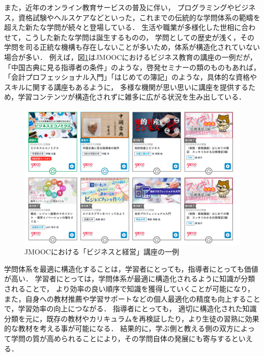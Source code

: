 また，近年のオンライン教育サービスの普及に伴い，
プログラミングやビジネス，資格試験やヘルスケアなどといった，これまでの伝統的な学問体系の範疇を超えた新たな学問が続々と登場している．
生活や職業が多様化した世相に合わせて，こうした新たな学問は誕生するものの，
学問としての歴史が浅く，その学問を司る正統な機構も存在しないことが多いため，体系が構造化されていない場合が多い．
例えば，図\ref{fig:business}はJMOOCにおけるビジネス教育の講座の一例だが，
「中国古典に見る指導者の条件」のような，啓発セミナーの類のものもあれば，
「会計プロフェッショナル入門」「はじめての簿記」のような，具体的な資格やスキルに関する講座もあるように，
多様な機関が思い思いに講座を提供するため，学習コンテンツが構造化されずに雑多に広がる状況を生み出している．

\begin{figure}[htb]
\begin{center}
\includegraphics[width=400pt]{./img/business.pdf}
\end{center}
\caption{JMOOCにおける「ビジネスと経営」講座の一例}
\label{fig:business}
\end{figure}


学問体系を最適に構造化することは，学習者にとっても，指導者にとっても価値が高い．
学習者にとっては，学問体系が最適に構造化されるように知識が分類されることで，
より効率の良い順序で知識を獲得していくことが可能になり，
また，自身への教材推薦や学習サポートなどの個人最適化の精度も向上することで，学習効率の向上につながる．
指導者にとっても，
適切に構造化された知識分類を元に，既存の教材やカリキュラムを再検証したり，より生徒の習熟に効果的な教材を考える事が可能になる．
結果的に，学ぶ側と教える側の双方によって学問の質が高められることにより，その学問自体の発展にも寄与するといえる．

